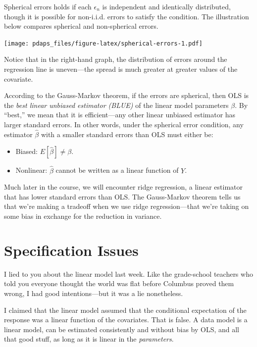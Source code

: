 \documentclass[12pt,oneside,openany]{book}
\begin{document}
Spherical errors holds if each \(\epsilon_n\) is independent and
identically distributed, though it is possible for non-i.i.d. errors to
satisfy the condition. The illustration below compares spherical and
non-spherical errors.

\texttt{[image: pdaps\_files/figure-latex/spherical-errors-1.pdf]}

Notice that in the right-hand graph, the distribution of errors around
the regression line is uneven---the spread is much greater at greater
values of the covariate.

According to the Gauss-Markov theorem, if the errors are spherical, then
OLS is the \emph{best linear unbiased estimator (BLUE)} of the linear
model parameters \(\beta\). By ``best,'' we mean that it is
efficient---any other linear unbiased estimator has larger standard
errors. In other words, under the spherical error condition, any
estimator \(\hat{\beta}\) with a smaller standard errors than OLS must
either be:

\begin{itemize}
\item
  Biased: \(E[\hat{\beta}] \neq \beta\).
\item
  Nonlinear: \(\hat{\beta}\) cannot be written as a linear function of
  \(Y\).
\end{itemize}

Much later in the course, we will encounter ridge regression, a linear
estimator that has lower standard errors than OLS. The Gauss-Markov
theorem tells us that we're making a tradeoff when we use ridge
regression---that we're taking on some bias in exchange for the
reduction in variance.

\chapter{Specification Issues}\label{specification}

\providecommand{\pderiv}{}
\renewcommand{\pderiv}[2]{\frac{\partial #1}{\partial #2}}

I lied to you about the linear model last week. Like the grade-school
teachers who told you everyone thought the world was flat before
Columbus proved them wrong, I had good intentions---but it was a lie
nonetheless.

I claimed that the linear model assumed that the conditional expectation
of the response was a linear function of the covariates. That is false.
A data model is a linear model, can be estimated consistently and
without bias by OLS, and all that good stuff, as long as it is linear in
the \emph{parameters}.
\end{document}
